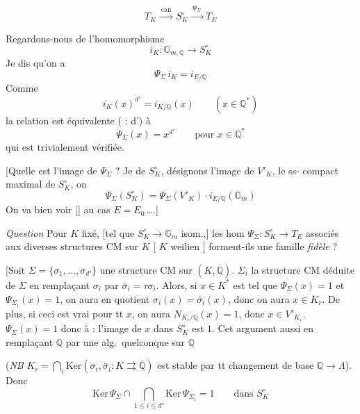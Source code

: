 \documentclass[11pt,a4paper]{article}
\begin{document}
\[
  T_{K} \xrightarrow{\;\mathrm{can}\;} S^{\circ}_{K}
  \xrightarrow{\;\Psi_{\Sigma}\;} T_{E}
\]

Regardons-nous de l'homomorphisme
\[
  i_{K} : \mathbb{G}_{m,\mathbb{Q}} \longrightarrow S^{\circ}_{K}
\]
Je dis qu'on a
\[
  \boxed{\Psi_{\Sigma}\, i_{K} = i_{E/\mathbb{Q}}}
\]
Comme \ill{}
\[
  i_{K}(x)^{d'} = i_{K/\mathbb{Q}}(x) \qquad (x \in \mathbb{Q}^{*})
\]
la relation est équivalente (\ill{} \ill{} : \ill{} d'\ill{}) à
\[
  \Psi_{\Sigma}(x) = x^{d'} \qquad \text{pour } x \in \mathbb{Q}^{*}
\]
qui est trivialement vérifiée.

[Quelle est l'image de $\Psi_{\Sigma}$ ? Je \ill{} \ill{} de
$S^{\circ}_{K}$, désignons l'image de $V'_{K}$, le ss-\struck{\ill{}}
 compact maximal de $S^{\circ}_{K}$, on
\[
  \Psi_{\Sigma}(S^{\circ}_{K}) = \Psi_{\Sigma}(V'_{K}) \cdot
  i_{E/\mathbb{Q}}(\mathbb{G}_{m})
\]
On va bien voir \struck{\ill{}} [] au cas $E =
E_{0}$\,….]

\emph{Question} Pour $K$ fixé, [tel que $S^{\circ}_{K} \to \mathbb{G}_{m}$
\ill{} \ill{} isom.,] les hom $\Psi_{\Sigma} : S^{\circ}_{K} \to T_{E}$
associés aux diverses structures CM sur $K$  [\ill{} $K$
weilien \ill{}] forment-ils une famille \emph{fidèle} ?

[Soit $\Sigma = \{\sigma_{1}, \ldots, \sigma_{d'}\}$ une structure CM sur
$(K, \overline{\mathbb{Q}})$.  $\Sigma_{i}$ la structure CM déduite de $\Sigma$ en
remplaçant $\sigma_{i}$ par $\bar{\sigma}_{i} = \tau\sigma_{i}$. Alors, si
$x \in K^{*}$ est tel que $\Psi_{\Sigma}(x) = 1$ et $\Psi_{\Sigma_{i}}(x) =
1$, on aura en quotient $\sigma_{i}(x) = \bar{\sigma}_{i}(x)$, donc on aura
$x \in K_{r}$. De plus, si ceci est vrai pour tt $x$, on aura
$N_{K_{r}/\mathbb{Q}}(x) = 1$, donc $x \in V'_{K_{r}}$.
 $\Psi_{\Sigma}(x) = 1$  donc à : l'image de
$x$ dans $S^{\circ}_{K}$ est $1$. Cet argument  aussi en
remplaçant $\mathbb{Q}$ par une alg.\ quelconque sur $\mathbb{Q}$
\struck{[car $\bigcap \mathrm{Ker}(\sigma_{i}, \bar{\sigma}_{i}) = K_{r}$ est
stable par]}

(\emph{NB} $K_{r} = \bigcap_{i} \mathrm{Ker}(\sigma_{i}, \bar{\sigma}_{i} :
K \rightrightarrows \overline{\mathbb{Q}})$ est stable par tt changement de
base $\mathbb{Q} \to \Lambda$). Donc
\[
  \mathrm{Ker}\,\Psi_{\Sigma} \cap \bigcap_{1 \leq i \leq d'}
  \mathrm{Ker}\,\Psi_{\Sigma_{i}} = 1 \qquad \text{dans } S^{\circ}_{K}
\]
\end{document}

